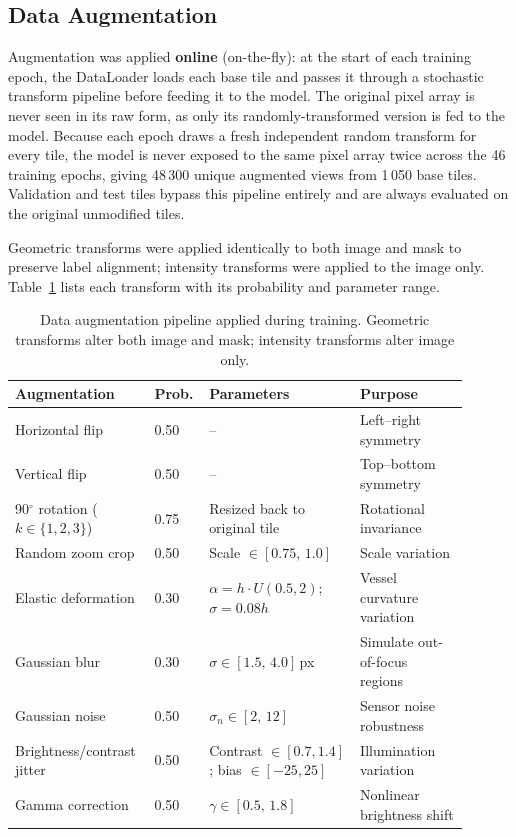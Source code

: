 \documentclass[11pt,letterpaper]{article}
\begin{document}
\subsection{Data Augmentation}
Augmentation was applied \textbf{online} (on-the-fly): at the start of each training epoch, the DataLoader loads each base tile and passes it through a stochastic transform pipeline before feeding it to the model. The original pixel array is never seen in its raw form, as only its randomly-transformed version is fed to the model. Because each epoch draws a fresh independent random transform for every tile, the model is never exposed to the same pixel array twice across the 46 training epochs, giving 48\,300 unique augmented views from 1\,050 base tiles. Validation and test tiles bypass this pipeline entirely and are always evaluated on the original unmodified tiles.

Geometric transforms were applied identically to both image and mask to preserve label alignment; intensity transforms were applied to the image only. Table~\ref{tab:augmentation} lists each transform with its probability and parameter range.

\begin{table}[htbp]
\centering
\caption{Data augmentation pipeline applied during training. Geometric transforms alter both image and mask; intensity transforms alter image only.}
\begin{tabular}{p{0.26\linewidth}p{0.09\linewidth}p{0.32\linewidth}p{0.23\linewidth}}
\toprule
Augmentation & Prob. & Parameters & Purpose \\
\midrule
Horizontal flip & 0.50 & -- & Left--right symmetry \\
Vertical flip & 0.50 & -- & Top--bottom symmetry \\
90$^\circ$ rotation ($k\in\{1,2,3\}$) & 0.75 & Resized back to original tile & Rotational invariance \\
Random zoom crop & 0.50 & Scale $\in[0.75,\,1.0]$ & Scale variation \\
Elastic deformation & 0.30 & $\alpha=h\cdot U(0.5,2)$;\; $\sigma=0.08h$ & Vessel curvature variation \\
Gaussian blur & 0.30 & $\sigma\in[1.5,\,4.0]$\,px & Simulate out-of-focus regions \\
Gaussian noise & 0.50 & $\sigma_n\in[2,\,12]$ & Sensor noise robustness \\
Brightness/contrast jitter & 0.50 & Contrast $\in[0.7,1.4]$; bias $\in[-25,25]$ & Illumination variation \\
Gamma correction & 0.50 & $\gamma\in[0.5,\,1.8]$ & Nonlinear brightness shift \\
\bottomrule
\end{tabular}
\label{tab:augmentation}
\end{table}
\end{document}
